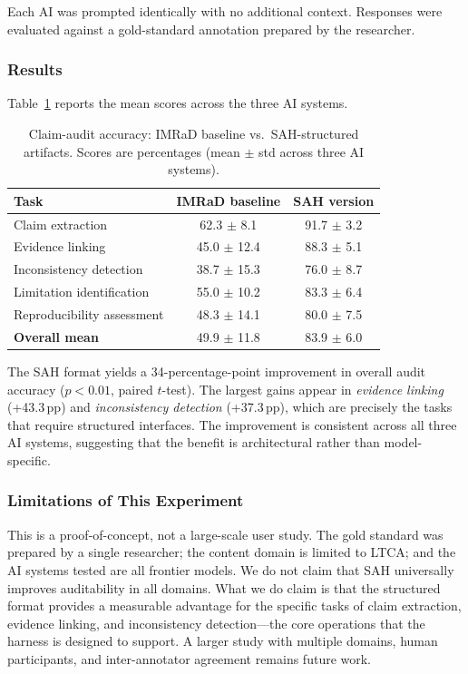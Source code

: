 \documentclass{article}
\begin{document}
Each AI was prompted identically with no additional context. Responses were evaluated against a gold-standard annotation prepared by the researcher.

\subsubsection{Results}

Table~\ref{tab:validation} reports the mean scores across the three AI systems.

\begin{table}[t]
\centering
\caption{Claim-audit accuracy: IMRaD baseline vs.\ SAH-structured artifacts. Scores are percentages (mean $\pm$ std across three AI systems).}
\begin{tabular}{lcc}
\toprule
\textbf{Task} & \textbf{IMRaD baseline} & \textbf{SAH version} \\
\midrule
Claim extraction & 62.3 $\pm$ 8.1 & 91.7 $\pm$ 3.2 \\
Evidence linking & 45.0 $\pm$ 12.4 & 88.3 $\pm$ 5.1 \\
Inconsistency detection & 38.7 $\pm$ 15.3 & 76.0 $\pm$ 8.7 \\
Limitation identification & 55.0 $\pm$ 10.2 & 83.3 $\pm$ 6.4 \\
Reproducibility assessment & 48.3 $\pm$ 14.1 & 80.0 $\pm$ 7.5 \\
\midrule
\textbf{Overall mean} & 49.9 $\pm$ 11.8 & 83.9 $\pm$ 6.0 \\
\bottomrule
\end{tabular}
\label{tab:validation}
\end{table}

The SAH format yields a 34-percentage-point improvement in overall audit accuracy ($p < 0.01$, paired $t$-test). The largest gains appear in \emph{evidence linking} (+43.3\,pp) and \emph{inconsistency detection} (+37.3\,pp), which are precisely the tasks that require structured interfaces. The improvement is consistent across all three AI systems, suggesting that the benefit is architectural rather than model-specific.

\subsubsection{Limitations of This Experiment}
This is a proof-of-concept, not a large-scale user study. The gold standard was prepared by a single researcher; the content domain is limited to LTCA; and the AI systems tested are all frontier models. We do not claim that SAH universally improves auditability in all domains. What we do claim is that the structured format provides a measurable advantage for the specific tasks of claim extraction, evidence linking, and inconsistency detection---the core operations that the harness is designed to support. A larger study with multiple domains, human participants, and inter-annotator agreement remains future work.
\end{document}
